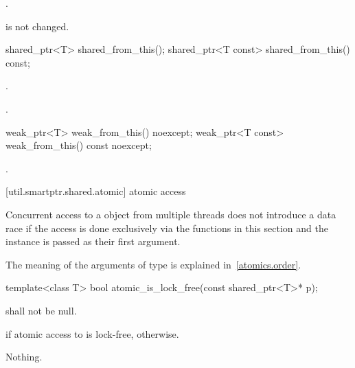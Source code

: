 \begin{itemdescr}
\pnum\returns  {}.

\pnum\begin{note}  is not changed. \end{note}
\end{itemdescr}

%
%
\begin{itemdecl}
shared_ptr<T>       shared_from_this();
shared_ptr<T const> shared_from_this() const;
\end{itemdecl}

\begin{itemdescr}
\pnum\returns  {}.

\pnum\postcondition  {}.
\end{itemdescr}

%
%
\begin{itemdecl}
weak_ptr<T>       weak_from_this() noexcept;
weak_ptr<T const> weak_from_this() const noexcept;
\end{itemdecl}

\begin{itemdescr}
\pnum\returns  {}.
\end{itemdescr}

[util.smartptr.shared.atomic]{ atomic access}

\pnum
Concurrent access to a  object from multiple threads does not
introduce a data race if the access is done exclusively via the functions in
this section and the instance is passed as their first argument.

\pnum
The meaning of the arguments of type  is explained in~\ref{atomics.order}.

%
\begin{itemdecl}
template<class T>
  bool atomic_is_lock_free(const shared_ptr<T>* p);
\end{itemdecl}

\begin{itemdescr}
\pnum
\requires {} shall not be null.

\pnum
\returns {} if atomic access to  is lock-free,  otherwise.

\pnum
\throws Nothing.
\end{itemdescr}

